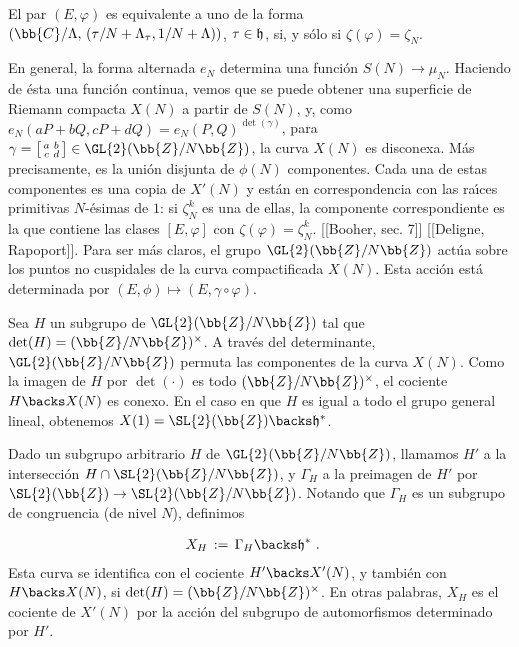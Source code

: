 El par $(E,\varphi)$ es equivalente a uno de la forma
$(\bb{C}/\Lambda,\,(\tau/N+\Lambda_{\tau},1/N+\Lambda))$, $\tau\in\frak{h}$, si,
y s\'{o}lo si $\zeta(\varphi)=\zeta_{N}$.

En general, la forma alternada $e_{N}$ determina una funci\'{o}n
$S(N)\rightarrow\mu_{N}$. Haciendo de \'{e}sta una funci\'{o}n continua, vemos
que se puede obtener una superficie de Riemann compacta $X(N)$ a partir de $S(N)$,
y, como $e_{N}(aP+bQ,cP+dQ)=e_{N}(P,Q)^{\det(\gamma)}$, para
\begin{math}\gamma=
\left[\begin{smallmatrix}a&b\\c&d\end{smallmatrix}\right]\in\GL{2}(\bb{Z}/N\bb{Z})
\end{math}, la curva $X(N)$ es disconexa.
M\'{a}s precisamente, es la uni\'{o}n disjunta de $\phi(N)$ componentes. Cada una
de estas componentes es una copia de $X'(N)$ y est\'{a}n en correspondencia con
las ra\'{\i}ces primitivas $N$-\'{e}simas de $1$: si $\zeta_{N}^{k}$ es una de
ellas, la componente correspondiente es la que contiene las clases $[E,\varphi]$
con $\zeta(\varphi)=\zeta_{N}^{k}$. [[Booher, sec. 7]] [[Deligne, Rapoport]].
Para ser m\'{a}s claros, el grupo $\GL{2}(\bb{Z}/N\bb{Z})$ act\'{u}a sobre los
puntos no cuspidales de la curva compactificada $X(N)$. Esta acci\'{o}n est\'{a}
determinada por $(E,\phi)\mapsto(E,\gamma\circ\varphi)$.

Sea $H$ un subgrupo de $\GL{2}(\bb{Z}/N\bb{Z})$ tal que
$\det(H)=(\bb{Z}/N\bb{Z})^{\times}$. A trav\'{e}s del determinante,
$\GL{2}(\bb{Z}/N\bb{Z})$ permuta las componentes de la curva $X(N)$. Como la
imagen de $H$ por $\det(\cdot)$ es todo $(\bb{Z}/N\bb{Z})^{\times}$, el cociente
$H\backs X(N)$ es conexo. En el caso en que $H$ es igual a todo el grupo general
lineal, obtenemos $X(1)=\SL{2}(\bb{Z})\backs\frak{h}^{*}$.

Dado un subgrupo arbitrario $H$ de $\GL{2}(\bb{Z}/N\bb{Z})$, llamamos $H'$ a la
intersecci\'{o}n $H\cap\SL{2}(\bb{Z}/N\bb{Z})$, y $\Gamma_{H}$ a la preimagen de
$H'$ por $\SL{2}(\bb{Z})\rightarrow\SL{2}(\bb{Z}/N\bb{Z})$. Notando que
$\Gamma_{H}$ es un subgrupo de congruencia (de nivel $N$), definimos

\begin{align*}
X_{H} & \,:=\,\Gamma_{H}\backs\frak{h}^{*}\text{ .}
\end{align*}
Esta curva se identifica con el cociente $H'\backs X'(N)$, y tambi\'{e}n con
$H\backs X(N)$, si $\det(H)=(\bb{Z}/N\bb{Z})^{\times}$. En otras palabras, $X_{H}$
es el cociente de $X'(N)$ por la acci\'{o}n del subgrupo de automorfismos
determinado por $H'$.

